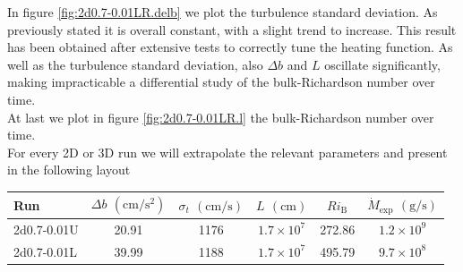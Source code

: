   In figure \ref{fig:2d0.7-0.01LR.delb} we plot the turbulence standard deviation. As previously stated it is overall constant, with a slight trend to increase. This result has been obtained after extensive tests to correctly tune the heating function. As well as the turbulence standard deviation, also $\Delta b$ and $L$ oscillate significantly, making impracticable a differential study of the bulk-Richardson number over time.\\
At last we plot in figure \ref{fig:2d0.7-0.01LR.l} the bulk-Richardson number over time.\\
For every 2D or 3D run we will extrapolate the relevant parameters and present in the following layout
\begin{center}
 \begin{tabular}{l|c|c|c|c|c}
	 Run & $\Delta b$  $(\mathrm{cm/s^{2}})$ & $\sigma_t$ $(\mathrm{cm/s})$ & $L$ $(\mathrm{cm})$ & $Ri_{\mathrm{B}}$ & $\dot{M}_{\mathrm{exp}}$ $(\mathrm{g/s})$\\
	  	\hline
		2d0.7-0.01U & 20.91 & 1176 & $1.7 \times 10^{7}$ & 272.86  & $1.2 \times 10^{9}$ \\
		\hline
		2d0.7-0.01L & 39.99 & 1188 & $1.7 \times 10^{7}$ & 495.79& $9.7 \times 10^{8}$ \\ 
      \end{tabular}
 \end{center}

